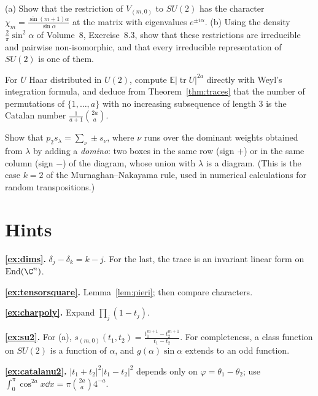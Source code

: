 \begin{exercise}[$\star\star$]\label{ex:su2}
(a) Show that the restriction of $V_{(m,0)}$ to $SU(2)$ has the character $\chi_m=\frac{\sin(m+1)\alpha}{\sin\alpha}$ at the matrix with eigenvalues $e^{\pm i\alpha}$. (b) Using the density $\frac2\pi\sin^2\alpha$ of Volume~8, Exercise~8.3, show that these restrictions are irreducible and
pairwise non-isomorphic, and that every irreducible representation of $SU(2)$ is one of them.
\end{exercise}

\begin{exercise}[$\star\star$]\label{ex:catalanu2}
For $U$ Haar distributed in $U(2)$, compute $\mathbb E|\operatorname{tr}U|^{2a}$ directly with Weyl's integration formula, and deduce from Theorem~\ref{thm:traces} that the number of permutations of $\{1,\dots,a\}$ with no increasing subsequence of length $3$ is the
Catalan number $\frac1{a+1}\binom{2a}a$.
\end{exercise}

\begin{exercise}[$\star\star\star$]\label{ex:domino}
Show that $p_2s_\lambda=\sum_\nu\pm s_\nu$, where $\nu$ runs over the dominant weights obtained from $\lambda$ by adding a \emph{domino}: two boxes in the same row (sign $+$) or in the same column (sign $-$) of the diagram, whose union with $\lambda$ is a diagram. (This is the
case $k=2$ of the Murnaghan--Nakayama rule, used in numerical calculations for random transpositions.)
\end{exercise}

\section{Hints}

\noindent\textbf{\ref{ex:dims}.} $\delta_j-\delta_k=k-j$. For the last, the trace is an invariant linear form on $\operatorname{End}(\C^n)$.

\noindent\textbf{\ref{ex:tensorsquare}.} Lemma~\ref{lem:pieri}; then compare characters.

\noindent\textbf{\ref{ex:charpoly}.} Expand $\prod_j(1-t_j)$.

\noindent\textbf{\ref{ex:su2}.} For (a), $s_{(m,0)}(t_1,t_2)=\frac{t_1^{m+1}-t_2^{m+1}}{t_1-t_2}$. For completeness, a class function on $SU(2)$ is a function of $\alpha$, and $g(\alpha)\sin\alpha$ extends to an odd function.

\noindent\textbf{\ref{ex:catalanu2}.} $|t_1+t_2|^2|t_1-t_2|^2$ depends only on $\varphi=\theta_1-\theta_2$; use $\int_0^\pi\cos^{2a}x\dd x=\pi\binom{2a}a4^{-a}$.

